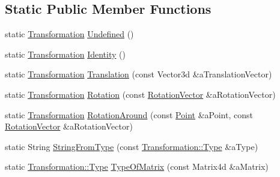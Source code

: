 \subsection*{Static Public Member Functions}
\begin{DoxyCompactItemize}
\item 
static \hyperlink{classlibrary_1_1math_1_1geom_1_1d3_1_1_transformation}{Transformation} \hyperlink{classlibrary_1_1math_1_1geom_1_1d3_1_1_transformation_acb7375bde02ed5832d5937908bee7043}{Undefined} ()
\item 
static \hyperlink{classlibrary_1_1math_1_1geom_1_1d3_1_1_transformation}{Transformation} \hyperlink{classlibrary_1_1math_1_1geom_1_1d3_1_1_transformation_a8d5af972dbba51f5746f2248f5164b69}{Identity} ()
\item 
static \hyperlink{classlibrary_1_1math_1_1geom_1_1d3_1_1_transformation}{Transformation} \hyperlink{classlibrary_1_1math_1_1geom_1_1d3_1_1_transformation_a5f781ba4e25ce79a02afccbe94a1ab0a}{Translation} (const Vector3d \&a\+Translation\+Vector)
\item 
static \hyperlink{classlibrary_1_1math_1_1geom_1_1d3_1_1_transformation}{Transformation} \hyperlink{classlibrary_1_1math_1_1geom_1_1d3_1_1_transformation_a79978a6efb749a2e058aa0b2cea092b2}{Rotation} (const \hyperlink{classlibrary_1_1math_1_1geom_1_1d3_1_1trf_1_1rot_1_1_rotation_vector}{Rotation\+Vector} \&a\+Rotation\+Vector)
\item 
static \hyperlink{classlibrary_1_1math_1_1geom_1_1d3_1_1_transformation}{Transformation} \hyperlink{classlibrary_1_1math_1_1geom_1_1d3_1_1_transformation_a11d93f665adb24cc4fdf2244c8509082}{Rotation\+Around} (const \hyperlink{classlibrary_1_1math_1_1geom_1_1d3_1_1objects_1_1_point}{Point} \&a\+Point, const \hyperlink{classlibrary_1_1math_1_1geom_1_1d3_1_1trf_1_1rot_1_1_rotation_vector}{Rotation\+Vector} \&a\+Rotation\+Vector)
\item 
static String \hyperlink{classlibrary_1_1math_1_1geom_1_1d3_1_1_transformation_a9511c7844b5b8af0c8c7ad97454a5a96}{String\+From\+Type} (const \hyperlink{classlibrary_1_1math_1_1geom_1_1d3_1_1_transformation_a25f1dc99d391174bf82a7132d08b2fc1}{Transformation\+::\+Type} \&a\+Type)
\item 
static \hyperlink{classlibrary_1_1math_1_1geom_1_1d3_1_1_transformation_a25f1dc99d391174bf82a7132d08b2fc1}{Transformation\+::\+Type} \hyperlink{classlibrary_1_1math_1_1geom_1_1d3_1_1_transformation_aa532f2c9f56ee5aff63417283a930584}{Type\+Of\+Matrix} (const Matrix4d \&a\+Matrix)
\end{DoxyCompactItemize}
